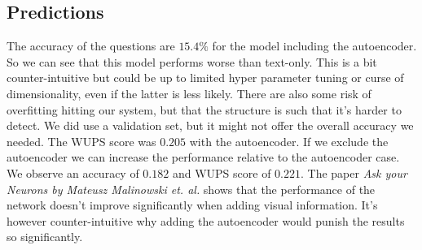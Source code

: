 \documentclass[10pt,a4paper]{report}
\begin{document}
	\subsection*{Predictions}
	The accuracy of the questions are $ 15.4\% $ for the model including the autoencoder. So we can see that this model performs worse than text-only. This is a bit counter-intuitive but could be up to limited hyper parameter tuning or curse of dimensionality, even if the latter is less likely. There are also some risk of overfitting hitting our system, but that the structure is such that it's harder to detect. We did use a validation set, but it might not offer the overall accuracy we needed. The WUPS score was $ 0.205 $ with the autoencoder. If we exclude the autoencoder we can increase the performance relative to the autoencoder case. We observe an accuracy of $ 0.182 $ and WUPS score of $ 0.221 $. The paper \textit{Ask your Neurons by Mateusz Malinowski et. al.} shows that the performance of the network doesn't improve significantly when adding visual information. It's however counter-intuitive why adding the autoencoder would punish the results so significantly.  
	
	
\end{document}
